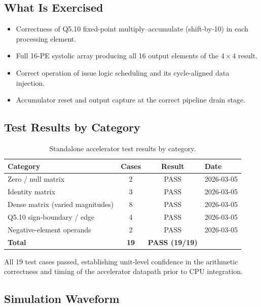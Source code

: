 ﻿\documentclass[12pt,a4paper]{report}
\renewcommand{\arraystretch}{1.2}
\begin{document}
\subsection{What Is Exercised}

\begin{itemize}
    \item Correctness of Q5.10 fixed-point multiply–accumulate (shift-by-10) in each processing element.
    \item Full 16-PE systolic array producing all 16 output elements of the $4 \times 4$ result.
    \item Correct operation of issue logic scheduling and its cycle-aligned data injection.
    \item Accumulator reset and output capture at the correct pipeline drain stage.
\end{itemize}

\subsection{Test Results by Category}

\begin{table}[H]
\centering
\caption{Standalone accelerator test results by category.}
\label{tab:standalone_tests}
\small
\setlength{\tabcolsep}{8pt}
\renewcommand{\arraystretch}{1.3}
\begin{tabular}{lccl}
\toprule
\textbf{Category} & \textbf{Cases} & \textbf{Result} & \textbf{Date} \\
\midrule
Zero / null matrix             & 2  & PASS & 2026-03-05 \\
Identity matrix                & 3  & PASS & 2026-03-05 \\
Dense matrix (varied magnitudes) & 8 & PASS & 2026-03-05 \\
Q5.10 sign-boundary / edge     & 4  & PASS & 2026-03-05 \\
Negative-element operands      & 2  & PASS & 2026-03-05 \\
\midrule
\textbf{Total}                 & \textbf{19} & \textbf{PASS (19/19)} & \\
\bottomrule
\end{tabular}
\end{table}

All 19 test cases passed, establishing unit-level confidence in the arithmetic correctness and timing of the accelerator datapath prior to CPU integration.

\subsection{Simulation Waveform}
\end{document}
